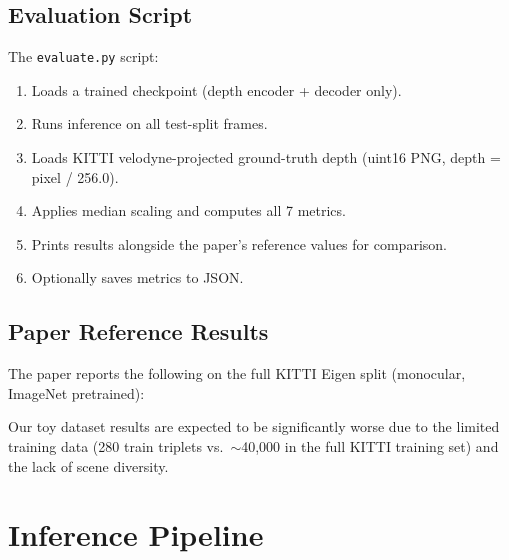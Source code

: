 \documentclass[10pt, a4paper, twocolumn]{article}
\begin{document}
\subsection{Evaluation Script}

The \texttt{evaluate.py} script:
\begin{enumerate}[noitemsep]
    \item Loads a trained checkpoint (depth encoder + decoder only).
    \item Runs inference on all test-split frames.
    \item Loads KITTI velodyne-projected ground-truth depth (uint16 PNG, depth = pixel / 256.0).
    \item Applies median scaling and computes all 7 metrics.
    \item Prints results alongside the paper's reference values for comparison.
    \item Optionally saves metrics to JSON.
\end{enumerate}

\subsection{Paper Reference Results}

The paper reports the following on the full KITTI Eigen split (monocular, ImageNet pretrained):

\begin{table}[H]
\centering
\caption{Paper reference results (full KITTI, 697 test images).}
\label{tab:paper_results}
\end{table}

Our toy dataset results are expected to be significantly worse due to the limited training data (280 train triplets vs.\ $\sim$40{,}000 in the full KITTI training set) and the lack of scene diversity.

\section{Inference Pipeline}
\label{sec:infer}
\end{document}
